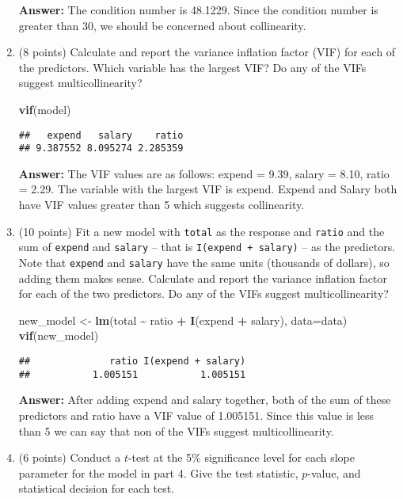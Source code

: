 \documentclass[
]{article}
\newenvironment{Shaded}{\begin{snugshade}}{\end{snugshade}}
\newcommand{\AttributeTok}[1]{\textcolor[rgb]{0.13,0.29,0.53}{#1}}
\newcommand{\FunctionTok}[1]{\textcolor[rgb]{0.13,0.29,0.53}{\textbf{#1}}}
\newcommand{\NormalTok}[1]{#1}
\newcommand{\OtherTok}[1]{\textcolor[rgb]{0.56,0.35,0.01}{#1}}
\newcommand{\SpecialCharTok}[1]{\textcolor[rgb]{0.81,0.36,0.00}{\textbf{#1}}}
\begin{document}
\begin{enumerate}
  \textbf{Answer:} The condition number is 48.1229. Since the condition
  number is greater than 30, we should be concerned about collinearity.
\item
  (8 points) Calculate and report the variance inflation factor (VIF)
  for each of the predictors. Which variable has the largest VIF? Do any
  of the VIFs suggest multicollinearity?

\begin{Shaded}
\begin{Highlighting}[]
\FunctionTok{vif}\NormalTok{(model)}
\end{Highlighting}
\end{Shaded}

\begin{verbatim}
##   expend   salary    ratio 
## 9.387552 8.095274 2.285359
\end{verbatim}

  \textbf{Answer:} The VIF values are as follows: expend = 9.39, salary
  = 8.10, ratio = 2.29. The variable with the largest VIF is expend.
  Expend and Salary both have VIF values greater than 5 which suggests
  collinearity.
\item
  (10 points) Fit a new model with \texttt{total} as the response and
  \texttt{ratio} and the sum of \texttt{expend} and \texttt{salary} --
  that is \texttt{I(expend\ +\ salary)} -- as the predictors. Note that
  \texttt{expend} and \texttt{salary} have the same units (thousands of
  dollars), so adding them makes sense. Calculate and report the
  variance inflation factor for each of the two predictors. Do any of
  the VIFs suggest multicollinearity?

\begin{Shaded}
\begin{Highlighting}[]
\NormalTok{new\_model }\OtherTok{\textless{}{-}} \FunctionTok{lm}\NormalTok{(total }\SpecialCharTok{\textasciitilde{}}\NormalTok{ ratio }\SpecialCharTok{+} \FunctionTok{I}\NormalTok{(expend }\SpecialCharTok{+}\NormalTok{ salary), }\AttributeTok{data=}\NormalTok{data)}
\FunctionTok{vif}\NormalTok{(new\_model)}
\end{Highlighting}
\end{Shaded}

\begin{verbatim}
##              ratio I(expend + salary) 
##           1.005151           1.005151
\end{verbatim}

  \textbf{Answer:} After adding expend and salary together, both of the
  sum of these predictors and ratio have a VIF value of 1.005151. Since
  this value is less than 5 we can say that non of the VIFs suggest
  multicollinearity.
\item
  (6 points) Conduct a \(t\)-test at the 5\% significance level for each
  slope parameter for the model in part 4. Give the test statistic,
  \(p\)-value, and statistical decision for each test.


\end{enumerate}
\end{document}
